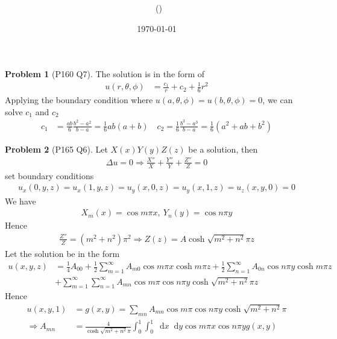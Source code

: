 \documentclass[twoside,11pt]{article}
\title{{\sffamily \Code \ \Ass}}
\author{\sffamily \name \ (\href{mailto:\mail}{\mail})}
\date{\sffamily \today}
\makeatletter
\renewcommand*\d{\mathop{}\!\mathrm{d}}
\theoremstyle{definition}
\newtheorem{problem}{Problem}
\theoremstyle{remark}
\newtheorem*{remark}{Remark}
\renewcommand{\maketitle}{\bgroup\setlength{\parindent}{0pt}
\begin{flushleft}
  \textbf{\Large\@title}

  \@author
\end{flushleft}\egroup
}
\makeatother
\begin{document}
\maketitle
\thispagestyle{title}


\begin{problem}[P160 Q7]
The solution is in the form of
\begin{align*}
    u(r, \theta, \phi) &=
    \frac{c_1}{r} + c_2 + \frac{1}{6}r^2
\end{align*}
Applying the boundary condition where $u(a, \theta, \phi) = u(b, \theta, \phi) = 0$,
we can solve $c_1$ and $c_2$
\begin{align*}
    c_1 &= \frac{ab}{6}\frac{b^2-a^2}{b-a} = \frac{1}{6}ab(a+b) \quad
    c_2 = \frac{1}{6}\frac{b^3-a^3}{b-a} = \frac{1}{6}(a^2+ab+b^2)
\end{align*}
\end{problem}


\begin{problem}[P165 Q6]
Let $X(x)Y(y)Z(z)$ be a solution, then
\begin{align*}
    \Delta u = 0\Rightarrow
    \frac{X''}{X} + \frac{Y''}{Y} + \frac{Z''}{Z} = 0
\end{align*}
set boundary conditions
\begin{align*}
    u_x(0, y, z) = u_x(1, y, z) = u_y(x, 0, z) = u_y(x, 1, z)
    = u_z(x, y, 0) = 0
\end{align*}
We have
\begin{align*}
    X_m(x) = \cos m\pi x,\ Y_n(y) = \cos n\pi y
\end{align*}
Hence
\begin{align*}
    \frac{Z''}{Z} = (m^2+n^2)\pi^2 \Rightarrow
    Z(z) = A\cosh \sqrt{m^2+n^2}\pi z
\end{align*}
Let the solution be in the form
\begin{align*}
    u(x, y, z) &= 
    \frac{1}{4}A_{00} + 
    \frac{1}{2}\sum_{m=1}^\infty A_{m0}\cos m\pi x\cosh m\pi z + 
    \frac{1}{2}\sum_{n=1}^\infty A_{0n}\cos n\pi y\cosh m\pi z\\ &+
    \sum_{m=1}^\infty \sum_{n=1}^\infty A_{mn}\cos m\pi \cos n\pi y \cosh\sqrt{m^2+n^2}\pi z
\end{align*}
Hence
\begin{align*}
    u(x, y, 1) &= g(x, y) =
    \sum_{mn}A_{mn}\cos m\pi \cos n\pi y \cosh\sqrt{m^2+n^2}\pi\\
    \Rightarrow
    A_{mn} &= \frac{4}{\cosh\sqrt{m^2+n^2}\pi}\int_0^1\int_0^1\d x \d y
    \cos m\pi x \cos n\pi y g(x, y)
\end{align*}

\end{problem}
\end{document}
